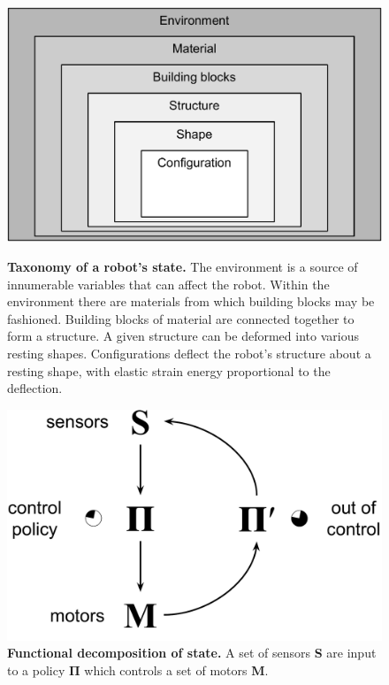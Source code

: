 \begin{enumerate}
    \begin{figure}[H]
    \begin{minipage}[t]{0.47\linewidth}
        \centering
        \includegraphics[width=\linewidth]{fig/taxonomy}
        \caption{\label{fig:taxonomy}\textbf{Taxonomy of a robot's state.} 
        The environment is a source of innumerable variables that can affect the robot.
        Within the environment there are materials from which building blocks may be fashioned.
        Building blocks of material are connected together to form a structure.
        A given structure can be deformed into various resting shapes.
        Configurations deflect the robot's structure about a resting shape, with elastic strain energy proportional to the deflection.
        }
    \end{minipage}
    \hfill
    \begin{minipage}[t]{0.47\linewidth}
        \centering
        \includegraphics[width=\linewidth]{fig/sensor-policy-motor.pdf}
        \caption{\label{fig:policy}\textbf{Functional decomposition of state.} A set of sensors {\rm\textbf{S}} are input to a policy $\mathbf{\Pi}$ which controls a set of motors {\rm\textbf{M}}.
}
\end{minipage}
\end{figure}
\end{enumerate}
